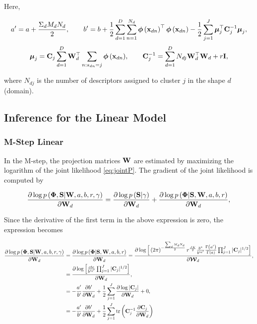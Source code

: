 	Here,
	
	\begin{align}
	a'=a+{\frac{\Sigma_d M_d N_d}{2}}, \quad \quad b'=b+{\frac{1}{2}}\sum\limits_{d=1}^{D}\sum\limits_{n=1}^{N_d}{\boldsymbol{\phi}\left(\mathbf{x}_{dn}\right)^{\top}\boldsymbol{\phi}\left(\mathbf{x}_{dn}\right)}-{\frac{1}{2}}\sum\limits_{j=1}^{J}\boldsymbol{\mu}_j^\top \mathbf{C}_j^{-1}\boldsymbol{\mu}_j,
	\end{align}
	\begin{align}
	\boldsymbol{\mu}_j =\mathbf{C}_j\sum\limits_{d=1}^{D}{\mathbf{W}_d^\top\sum\limits_{n:s_{dn}=j}{\boldsymbol{\phi}\left(\mathbf{x}_{dn}\right)}}, \quad \quad \mathbf{C}_{j}^{-1} =\sum\limits_{d=1}^{D}{N_{dj}\mathbf{W}_d^\top\mathbf{W}_d+r\mathbf{I}},
	\end{align}
	
	where $N_{dj}$ is the number of descriptors assigned to cluster $j$ in the shape $d$ (domain). 
	
	\subsection{Inference for the Linear Model}
	
	\subsubsection{M-Step Linear}
	
	In the M-step, the projection matrices $\mathbf{W}$ are estimated by maximizing the logarithm of the joint likelihood \eqref{eq:jointP}. The gradient of the joint likelihood is computed by
	
	\begin{align}
	\frac{\partial \log p\left(\boldsymbol{\Phi},\mathbf{S}|\mathbf{W},a,b,r,\gamma\right)}{\partial\mathbf{W}_d} =
	\frac{\partial \log p\left(\mathbf{S}|\gamma\right)}{\partial\mathbf{W}_d} + \frac{\partial \log p\left(\boldsymbol{\Phi}|\mathbf{S},\boldsymbol{\mathbf{W}},a,b,r\right)}{\partial\mathbf{W}_d},
	\end{align}
	
	Since the derivative of the first term in the above expression is zero, the expression becomes
	
	\begin{align}
	\frac{\partial \log p\left(\boldsymbol{\Phi},\mathbf{S}|\mathbf{W},a,b,r,\gamma\right)}{\partial\mathbf{W}_d} &=
	\frac{\partial \log p\left(\boldsymbol{\Phi}|\mathbf{S},\mathbf{W},a,b,r\right)}{\partial\mathbf{W}_d} = \frac{\partial \log \Big[\left(2\pi\right)^{-\frac{\sum_d M_d N_d}{2}}r^{\frac{JK}{2}}\frac{b^{a}}{b'^{a'}}\frac{\Gamma\left(a'\right)}{\Gamma\left(a\right)}\prod_{j=1}^{J}|\mathbf{C}_j|^{1/2}\Big]}{\partial\boldsymbol{\mathcal{W}}_d},\notag\\
	&= \frac{\partial \log \Big[\frac{cte}{b'^{a'}} \prod_{j=1}^{J}|\mathbf{C}_j|^{1/2}\Big]}{\partial\mathbf{W}_d}\notag,\\
	& = -\frac{a'}{b'}\frac{\partial b'}{\partial\mathbf{W}_d}+\frac{1}{2}\sum_{j=1}^{J}\frac{\partial \log |\mathbf{C}_j|}{\partial\mathbf{W}_d}+0 , \notag \\
	& =  -\frac{a'}{b'}\frac{\partial b'}{\partial\mathbf{W}_d}+\frac{1}{2}\sum_{j=1}^{J} \operatorname{tr}\left(\mathbf{C}_j^{-1}\frac{\partial \mathbf{C}_j}{\partial\mathbf{W}_d}\right)
	\end{align}
	
